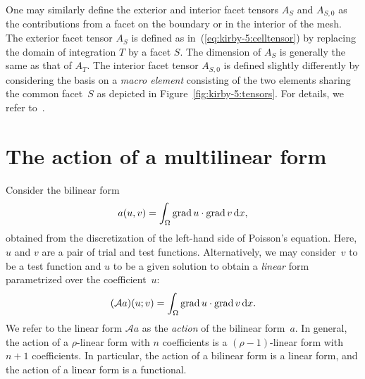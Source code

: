 One may similarly define the exterior and interior facet
tensors $A_S$ and $A_{S,0}$ as the contributions from a facet on the
boundary or in the interior of the mesh. The exterior facet tensor
$A_S$ is defined as in~(\ref{eq:kirby-5:celltensor}) by replacing the
domain of integration $T$ by a facet $S$. The dimension of $A_S$ is
generally the same as that of $A_T$. The interior facet tensor
$A_{S,0}$ is defined slightly differently by considering the basis on
a \emph{macro element} consisting of the two elements sharing the
common facet~$S$ as depicted in Figure~\ref{fig:kirby-5:tensors}. For
details, we refer to~\citet{OelgaardLoggWells2008}.

\section{The action of a multilinear form}

Consider the bilinear form
\begin{equation}
  a(u, v) = \int_{\Omega} \operatorname{grad} u \cdot \operatorname{grad} v \, \mathrm{d}x,
\end{equation}
obtained from the discretization of the left-hand side of Poisson's
equation. Here, $u$ and $v$ are a pair of trial and test functions.
Alternatively, we may consider~$v$ to be a test function and $u$ to be
a given solution to obtain a \emph{linear} form parametrized over the
coefficient~$u$:
\begin{equation}
  (\mathcal{A} a) (u; v) = \int_{\Omega} \operatorname{grad} u \cdot \operatorname{grad} v \, \mathrm{d}x.
\end{equation}
We refer to the linear form $\mathcal{A}a$ as the \emph{action} of the
bilinear form~$a$. In general, the action of a $\rho$-linear form with
$n$ coefficients is a $(\rho-1)$-linear form with $n+1$ coefficients.
In particular, the action of a bilinear form is a linear form, and the
action of a linear form is a functional.

